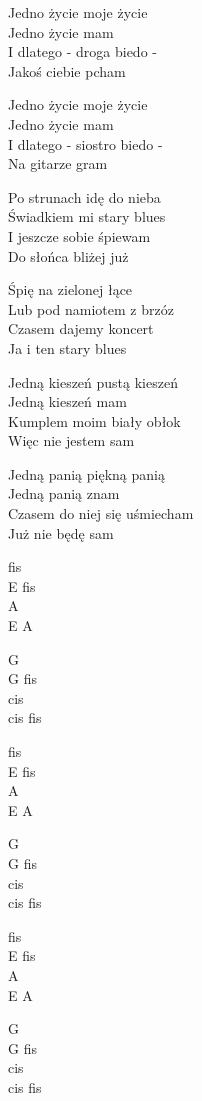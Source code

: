 \begin{text}
    Jedno życie moje życie\\
    Jedno życie mam\\
    I dlatego - droga biedo -\\
    Jakoś ciebie pcham

    Jedno życie moje życie\\
    Jedno życie mam\\
    I dlatego - siostro biedo -\\
    Na gitarze gram

    \vin Po strunach idę do nieba\\
    \vin Świadkiem mi stary blues\\
    \vin I jeszcze sobie śpiewam\\
    \vin Do słońca bliżej już

    \vin Śpię na zielonej łące\\
    \vin Lub pod namiotem z brzóz\\
    \vin Czasem dajemy koncert\\
    \vin Ja i ten stary blues

    Jedną kieszeń pustą kieszeń\\
    Jedną kieszeń mam\\
    Kumplem moim biały obłok\\
    Więc nie jestem sam

    Jedną panią piękną panią\\
    Jedną panią znam\\
    Czasem do niej się uśmiecham\\
    Już nie będę sam
\end{text}
\begin{chord}
    fis\\
    E fis\\
    A\\
    E A

    G\\
    G fis\\
    cis\\
    cis fis

    fis\\
    E fis\\
    A\\
    E A

    G\\
    G fis\\
    cis\\
    cis fis

    fis\\
    E fis\\
    A\\
    E A

    G\\
    G fis\\
    cis\\
    cis fis
\end{chord}
